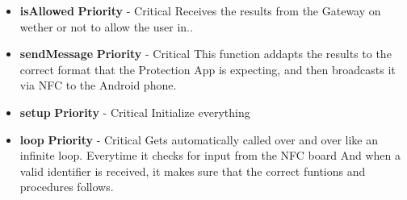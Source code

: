 \documentclass{article}
\begin{document}
		\begin{itemize}
			\item \textbf{isAllowed}
				\newline\textbf{ Priority } - Critical
				\newline Receives the results from the Gateway on wether or not to allow the user in..
			\item \textbf{sendMessage}
				\newline\textbf{ Priority } - Critical
				\newline This function addapts the results to the correct format that the Protection App is expecting, and then broadcasts it via NFC to the Android phone.



			\item \textbf{setup}
				\newline\textbf{ Priority } - Critical
				\newline Initialize everything
			\item \textbf{loop}
				\newline\textbf{ Priority } - Critical
				\newline Gets automatically called over and over like an infinite loop. Everytime it checks for input from the NFC board And when a valid identifier is received, it makes sure that the correct funtions and procedures follows.

		\end{itemize}
\end{document}

